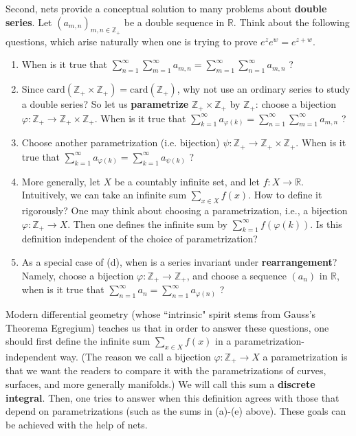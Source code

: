 \documentclass[12pt,b5paper,notitlepage]{article}
\theoremstyle{definition}
\theoremstyle{plain}
\newcommand{\Zbb}{\mathbb Z}
\newcommand{\Rbb}{\mathbb R}
\newcommand{\card}{\mathrm{card}}
\newcommand{\dps}{\displaystyle}
\numberwithin{equation}{section}
\begin{document}
Second, nets provide a conceptual solution to many problems about \textbf{double series}. Let $(a_{m,n})_{m,n\in\Zbb_+}$ be a double sequence in $\Rbb$. Think about the following questions, which arise naturally when one is trying to prove $e^ze^w=e^{z+w}$.
\begin{enumerate}[label=(\alph*)]
\item When is it true that $\dps \sum_{n=1}^\infty\sum_{m=1}^\infty a_{m,n}=\sum_{m=1}^\infty\sum_{n=1}^\infty a_{m,n}$ ?
\item Since $\card(\Zbb_+\times\Zbb_+)=\card(\Zbb_+)$, why not use an ordinary series to study a double series? So let us \textbf{parametrize} $\Zbb_+\times\Zbb_+$ by $\Zbb_+$: choose a bijection $\varphi:\Zbb_+\rightarrow \Zbb_+\times\Zbb_+$. When is it true that $\dps  \sum_{k=1}^\infty a_{\varphi(k)}=\sum_{n=1}^\infty\sum_{m=1}^\infty a_{m,n}$ ?
\item Choose another parametrization (i.e. bijection) $\psi:\Zbb_+\rightarrow\Zbb_+\times\Zbb_+$. When is it true that $\dps  \sum_{k=1}^\infty a_{\varphi(k)}=\sum_{k=1}^\infty a_{\psi(k)}$ ?
\item More generally, let $X$ be a countably infinite set, and let $f:X\rightarrow\Rbb$. Intuitively, we can take an infinite sum $\dps\sum_{x\in X}f(x)$. How to define it rigorously? One may think about choosing a parametrization, i.e., a bijection $\varphi:\Zbb_+\rightarrow X$. Then one defines the infinite sum by $\sum_{k=1}^\infty f(\varphi(k))$. Is this definition independent of the choice of parametrization?
\item As a special case of (d), when is a series invariant under \textbf{rearrangement}? Namely, choose a bijection $\varphi:\Zbb_+\rightarrow\Zbb_+$, and choose a sequence $(a_n)$ in $\Rbb$, when is it true that $\dps\sum_{n=1}^\infty a_n=\sum_{n=1}^\infty a_{\varphi(n)}$ ?
\end{enumerate}

Modern differential geometry (whose ``intrinsic" spirit stems from Gauss's Theorema Egregium) teaches us that in order to answer these questions, one should first define the infinite sum $\sum_{x\in X}f(x)$ in a parametrization-independent way. (The reason we call a bijection $\varphi:\Zbb_+\rightarrow X$ a parametrization is that we want the readers to compare it with the parametrizations of curves, surfaces, and more generally manifolds.)  We will call this sum a \textbf{discrete integral}. Then, one tries to answer when this definition agrees with those that depend on parametrizations (such as the sums in (a)-(e) above). These goals can be achieved with the help of nets.
\end{document}
